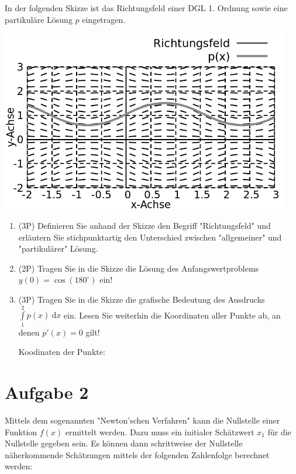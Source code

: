 \documentclass[12pt]{article}
\providecommand\d{}
\renewcommand{\d}[1]{\:\mathrm{d}{#1}}
\begin{document}
In der folgenden Skizze ist das Richtungsfeld einer DGL 1. Ordnung sowie eine partikuläre Lösung $p$ eingetragen.

\begin{center}
\includegraphics[width=0.95\textwidth]{grid-trial.png}
\end{center}

\begin{enumerate}[label=(\alph*)]
\item (3P) Definieren Sie anhand der Skizze den Begriff "Richtungsfeld" und erläutern Sie stichpunktartig den Unterschied zwischen "allgemeiner" und "partikulärer" Lösung.

\bigskip
\bigskip
\bigskip
\bigskip
\bigskip
\bigskip
\bigskip
\bigskip
\bigskip

\item (2P) Tragen Sie in die Skizze die Lösung des Anfangswertproblems $y(0) = \cos(180^\circ)$ ein!

\bigskip

\item (3P) Tragen Sie in die Skizze die grafische Bedeutung des Ausdrucks $\int\limits_1^2 p(x) \d{x}$ ein. Lesen Sie weiterhin die Koordinaten aller Punkte ab, an denen $p'(x)=0$ gilt!

\bigskip
Koodinaten der Punkte: 

\end {enumerate}

\newpage
\section* {Aufgabe 2} Mittels dem sogenannten "Newton'schen Verfahren" kann die Nullstelle einer Funktion $f(x)$ ermittelt werden. Dazu muss ein initialer Schätzwert $x_1$ für die Nullstelle gegeben sein. Es können dann schrittweise der Nullstelle näherkommende Schätzungen mittels der folgenden Zahlenfolge berechnet werden:
\end{document}
